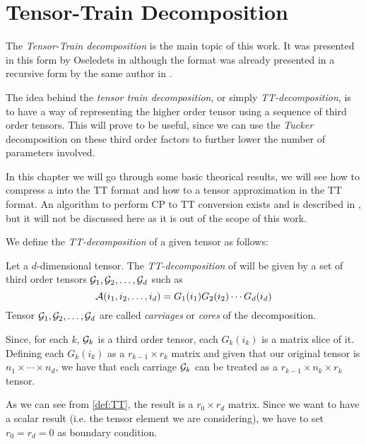 \chapter{Tensor-Train Decomposition}

The \emph{Tensor-Train decomposition} is the main topic of this work. It was presented in this form by Oseledets in \cite{oseledets2011tt} although the format was already presented in a recursive form by the same author in \cite{oseledetstyrty2009}.

The idea behind the \emph{tensor train decomposition}, or simply \emph{TT-decomposition}, is to have a way of representing the higher order tensor using a sequence of third order tensors. This will prove to be useful, since we can use the \emph{Tucker} decomposition on these third order factors to further lower the number of parameters involved.

In this chapter we will go through some basic theorical results, we will see how to compress a  into the TT format and how to  a tensor approximation in the TT format. An algorithm to perform CP to TT conversion exists and is described in \cite{oseledets2011tt}, but it will not be discussed here as it is out of the scope of this work.

We define the \emph{TT-decomposition} of a given tensor \A as follows:

\begin{Def}
  Let \A a $d$-dimensional tensor. The \emph{TT-decomposition} of \A will be given by a set of third order tensors $\mathcal{G}_1,\mathcal{G}_2,\dots,\mathcal{G}_d$ such as
  \begin{equation} \label{def:TT}
    \mathcal{A}(i_1,i_2,\dots,i_d) = G_1(i_1)G_2(i_2)\cdots G_d(i_d)
  \end{equation}
  Tensor $\mathcal{G}_1,\mathcal{G}_2,\dots,\mathcal{G}_d$ are called \emph{carriages} or \emph{cores} of the decomposition.
\end{Def}

Since, for each $k$, $\mathcal{G}_k$ is a third order tensor, each $G_k(i_k)$ is a matrix slice of it. Defining each $G_k(i_k)$ as a $r_{k-1} \times r_k$ matrix and given that our original tensor \A is $n_1 \times \cdots \times n_d$, we have that each carriage $\mathcal{G}_k$ can be treated as a $r_{k-1} \times n_k \times r_k$ tensor.

As we can see from \ref{def:TT}, the result is a $r_0 \times r_d$ matrix. Since we want to have a scalar result (i.e. the tensor element we are considering), we have to set $r_0 = r_d = 0$ as boundary condition.


